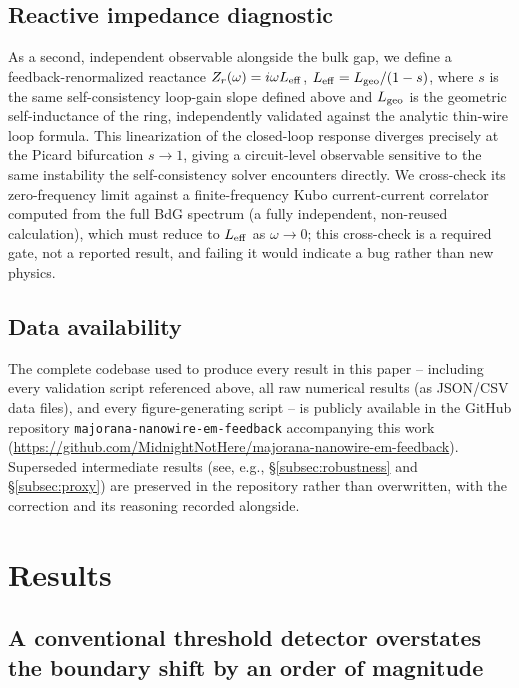 \documentclass[aps,physrev,reprint,superscriptaddress,amsmath,amssymb,floatfix]{revtex4-2}
\begin{document}
\subsection{Reactive impedance diagnostic}

As a second, independent observable alongside the bulk gap, we define a
feedback-renormalized reactance $Z_r(\omega)=i\omega L_{\rm eff}$,
$L_{\rm eff}=L_{\rm geo}/(1-s)$, where $s$ is the same self-consistency
loop-gain slope defined above and $L_{\rm geo}$ is the geometric
self-inductance of the ring, independently validated against the
analytic thin-wire loop formula. This linearization of the closed-loop
response diverges precisely at the Picard bifurcation $s\to1$, giving a
circuit-level observable sensitive to the same instability the
self-consistency solver encounters directly. We cross-check its
zero-frequency limit against a finite-frequency Kubo current-current
correlator computed from the full BdG spectrum (a fully independent,
non-reused calculation), which must reduce to $L_{\rm eff}$ as
$\omega\to0$; this cross-check is a required gate, not a reported result,
and failing it would indicate a bug rather than new physics.

\subsection{Data availability}
\label{sec:dataavail}
The complete codebase used to produce every result in this paper --
including every validation script referenced above, all raw numerical
results (as JSON/CSV data files), and every figure-generating script --
is publicly available in the GitHub repository
\texttt{majorana-nanowire-em-feedback} accompanying this work
(\url{https://github.com/MidnightNotHere/majorana-nanowire-em-feedback}).
Superseded intermediate results (see, e.g., \S\ref{subsec:robustness} and \S\ref{subsec:proxy})
are preserved in the repository rather than overwritten, with the
correction and its reasoning recorded alongside.

\FloatBarrier
\section{Results}
\label{sec:results}

\subsection{A conventional threshold detector overstates the boundary shift by an order of magnitude}
\label{subsec:threshold}
\end{document}

